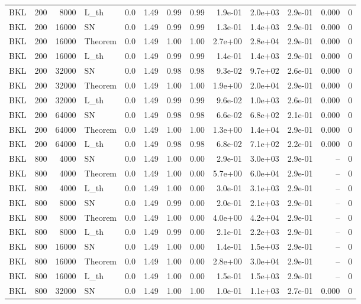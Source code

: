 \begin{tabular}{lrrlrrrrrrrrr}
BKL & 200 & 8000 & L\_th & 0.0 & 1.49 & 0.99 & 0.99 & 1.9e-01 & 2.0e+03 & 2.9e-01 & 0.000 & 0 \\
BKL & 200 & 16000 & SN & 0.0 & 1.49 & 0.99 & 0.99 & 1.3e-01 & 1.4e+03 & 2.9e-01 & 0.000 & 0 \\
BKL & 200 & 16000 & Theorem & 0.0 & 1.49 & 1.00 & 1.00 & 2.7e+00 & 2.8e+04 & 2.9e-01 & 0.000 & 0 \\
BKL & 200 & 16000 & L\_th & 0.0 & 1.49 & 0.99 & 0.99 & 1.4e-01 & 1.4e+03 & 2.9e-01 & 0.000 & 0 \\
BKL & 200 & 32000 & SN & 0.0 & 1.49 & 0.98 & 0.98 & 9.3e-02 & 9.7e+02 & 2.6e-01 & 0.000 & 0 \\
BKL & 200 & 32000 & Theorem & 0.0 & 1.49 & 1.00 & 1.00 & 1.9e+00 & 2.0e+04 & 2.9e-01 & 0.000 & 0 \\
BKL & 200 & 32000 & L\_th & 0.0 & 1.49 & 0.99 & 0.99 & 9.6e-02 & 1.0e+03 & 2.6e-01 & 0.000 & 0 \\
BKL & 200 & 64000 & SN & 0.0 & 1.49 & 0.98 & 0.98 & 6.6e-02 & 6.8e+02 & 2.1e-01 & 0.000 & 0 \\
BKL & 200 & 64000 & Theorem & 0.0 & 1.49 & 1.00 & 1.00 & 1.3e+00 & 1.4e+04 & 2.9e-01 & 0.000 & 0 \\
BKL & 200 & 64000 & L\_th & 0.0 & 1.49 & 0.98 & 0.98 & 6.8e-02 & 7.1e+02 & 2.2e-01 & 0.000 & 0 \\
BKL & 800 & 4000 & SN & 0.0 & 1.49 & 1.00 & 0.00 & 2.9e-01 & 3.0e+03 & 2.9e-01 & -- & 0 \\
BKL & 800 & 4000 & Theorem & 0.0 & 1.49 & 1.00 & 0.00 & 5.7e+00 & 6.0e+04 & 2.9e-01 & -- & 0 \\
BKL & 800 & 4000 & L\_th & 0.0 & 1.49 & 1.00 & 0.00 & 3.0e-01 & 3.1e+03 & 2.9e-01 & -- & 0 \\
BKL & 800 & 8000 & SN & 0.0 & 1.49 & 0.99 & 0.00 & 2.0e-01 & 2.1e+03 & 2.9e-01 & -- & 0 \\
BKL & 800 & 8000 & Theorem & 0.0 & 1.49 & 1.00 & 0.00 & 4.0e+00 & 4.2e+04 & 2.9e-01 & -- & 0 \\
BKL & 800 & 8000 & L\_th & 0.0 & 1.49 & 0.99 & 0.00 & 2.1e-01 & 2.2e+03 & 2.9e-01 & -- & 0 \\
BKL & 800 & 16000 & SN & 0.0 & 1.49 & 1.00 & 0.00 & 1.4e-01 & 1.5e+03 & 2.9e-01 & -- & 0 \\
BKL & 800 & 16000 & Theorem & 0.0 & 1.49 & 1.00 & 0.00 & 2.8e+00 & 3.0e+04 & 2.9e-01 & -- & 0 \\
BKL & 800 & 16000 & L\_th & 0.0 & 1.49 & 1.00 & 0.00 & 1.5e-01 & 1.5e+03 & 2.9e-01 & -- & 0 \\
BKL & 800 & 32000 & SN & 0.0 & 1.49 & 1.00 & 1.00 & 1.0e-01 & 1.1e+03 & 2.7e-01 & 0.000 & 0 \\

\end{tabular}
